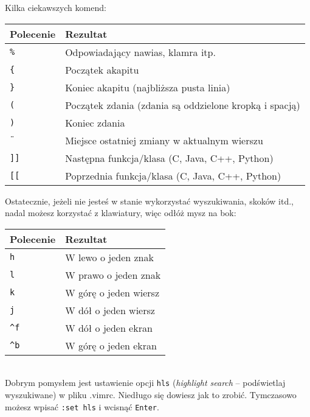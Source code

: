 \documentclass[a4paper,12pt]{article}
\begin{document}
\noindent
Kilka ciekawszych komend:

\begin{tabular}{ l | p{} }
{\bf Polecenie} & {\bf Rezultat} \\ \hline
{\tt \%} & Odpowiadający nawias, klamra itp. \\
{\tt \{} & Początek akapitu \\
{\tt \}} & Koniec akapitu (najbliższa pusta linia) \\
{\tt (} & Początek zdania (zdania są oddzielone kropką i spacją) \\
{\tt )} & Koniec zdania \\
{\tt \"{}} & Miejsce ostatniej zmiany w aktualnym wierszu \\
{\tt ]]} & Następna funkcja/klasa (C, Java, C++, Python) \\
{\tt [[} & Poprzednia funkcja/klasa (C, Java, C++, Python) \\ \hline
\end{tabular}\newpage

\noindent
Ostatecznie, jeżeli nie jesteś w stanie wykorzystać wyszukiwania, skoków itd., nadal możesz korzystać z klawiatury, więc odłóż mysz na bok: 

\begin{tabular}{ l | p{} }
{\bf Polecenie} & {\bf Rezultat} \\ \hline
{\tt h} & W lewo o jeden znak \\
{\tt l} & W prawo o jeden znak \\
{\tt k} & W górę o jeden wiersz \\
{\tt j} & W dół o jeden wiersz \\
{\tt \^{}f} & W dół o jeden ekran \\
{\tt \^{}b} & W górę o jeden ekran \\ \hline
\end{tabular}\\

\noindent
Dobrym pomysłem jest ustawienie opcji {\tt hls} ({\it highlight search} – podświetlaj wyszukiwane) w pliku .vimrc. Niedługo się dowiesz jak to zrobić. Tymczasowo możesz wpisać {\tt :set hls} i wcisnąć {\tt Enter}.
\end{document}
